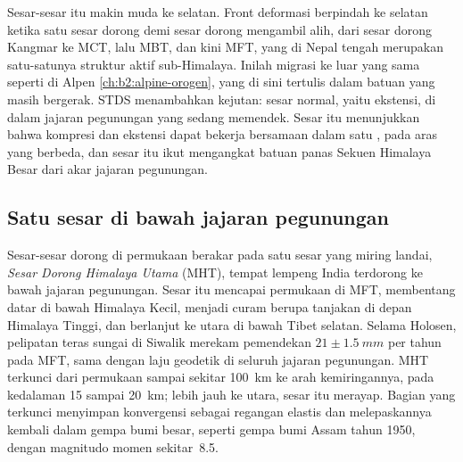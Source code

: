 Sesar-sesar itu makin muda ke selatan. Front deformasi berpindah ke selatan ketika satu sesar dorong demi sesar dorong
mengambil alih, dari sesar dorong Kangmar ke MCT, lalu MBT, dan kini MFT, yang di
Nepal tengah merupakan satu-satunya struktur aktif sub-Himalaya. Inilah migrasi ke luar yang sama
seperti di Alpen \cref{ch:b2:alpine-orogen}, yang di sini tertulis dalam batuan yang masih
bergerak. STDS menambahkan kejutan: sesar normal, yaitu ekstensi, di dalam jajaran pegunungan yang sedang
memendek. Sesar itu menunjukkan bahwa kompresi dan ekstensi dapat bekerja bersamaan dalam satu ,
pada aras yang berbeda, dan sesar itu ikut mengangkat batuan panas Sekuen Himalaya Besar
dari akar jajaran pegunungan.

\subsection{Satu sesar di bawah jajaran pegunungan}

Sesar-sesar dorong di permukaan berakar pada satu sesar yang miring landai, \emph{Sesar Dorong
Himalaya Utama} (MHT), tempat lempeng India terdorong ke bawah jajaran pegunungan. Sesar itu mencapai
permukaan di MFT, membentang datar di bawah Himalaya Kecil, menjadi curam berupa tanjakan di
depan Himalaya Tinggi, dan berlanjut ke utara di bawah Tibet selatan. Selama Holosen,
pelipatan teras sungai di Siwalik merekam pemendekan $21 \pm \qty{1.5}{mm}$ per tahun
pada MFT, sama dengan laju geodetik di seluruh jajaran pegunungan. MHT
terkunci dari permukaan sampai sekitar \qty{100}{km} ke arah kemiringannya, pada kedalaman 15 sampai \qty{20}{km}; lebih jauh
ke utara, sesar itu merayap. Bagian yang terkunci menyimpan konvergensi sebagai regangan elastis dan melepaskannya kembali
dalam gempa bumi besar, seperti gempa bumi Assam tahun 1950, dengan magnitudo momen sekitar~8.5.

